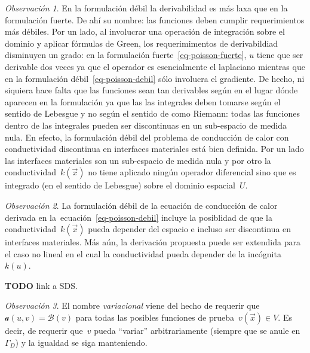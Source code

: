 \documentclass[
  12pt,
  a4paper,
  table]{scrbook}
\theoremstyle{plain}
\theoremstyle{definition}
\theoremstyle{plain}
\theoremstyle{plain}
\theoremstyle{remark}
\newtheorem*{remark}{Observación}
\begin{document}
\begin{remark}

En la formulación débil la derivabilidad es más laxa que en la
formulación fuerte. De ahí su nombre: las funciones deben cumplir
requerimientos más débiles. Por un lado, al involucrar una operación de
integración sobre el dominio y aplicar fórmulas de Green, los
requerimimentos de derivabildiad disminuyen un grado: en la formulación
fuerte~\ref{eq-poisson-fuerte}, \(u\) tiene que ser derivable dos veces
ya que el operador es esencialmente el laplaciano mientras que en la
formulación débil~\ref{eq-poisson-debil} sólo involucra el gradiente. De
hecho, ni siquiera hace falta que las funciones sean tan derivables
según en el lugar dónde aparecen en la formulación ya que las las
integrales deben tomarse según el sentido de Lebesgue y no según el
sentido de como Riemann: todas las funciones dentro de las integrales
pueden ser discontinuas en un sub-espacio de medida nula. En efecto, la
formulación débil del problema de conducción de calor con conductividad
discontinua en interfaces materiales está bien definida. Por un lado las
interfaces materiales son un sub-espacio de medida nula y por otro la
conductividad~\(k(\vec{x})\) no tiene aplicado ningún operador
diferencial sino que es integrado (en el sentido de Lebesgue) sobre el
dominio espacial~\(U\).

\end{remark}

\begin{remark}

La formulación débil de la ecuación de conducción de calor derivada en
la~ecuación~\ref{eq-poisson-debil} incluye la posiblidad de que la
conductividad~\(k(\vec{x})\) pueda depender del espacio e incluso ser
discontinua en interfaces materiales. Más aún, la derivación propuesta
puede ser extendida para el caso no lineal en el cual la conductividad
pueda depender de la incógnita~\(k(u)\).

\textbf{TODO} link a SDS.

\end{remark}

\begin{remark}

El nombre \emph{variacional} viene del hecho de requerir
que~\(\mathcal{a}(u,v) = \mathcal{B}(v)\) para todas las posibles
funciones de prueba~\(v(\vec{x}) \in V\). Es decir, de requerir
que~\(v\) pueda ``variar'' arbitrariamente (siempre que se anule
en~\(\Gamma_D\)) y la igualdad se siga manteniendo.

\end{remark}
\end{document}
